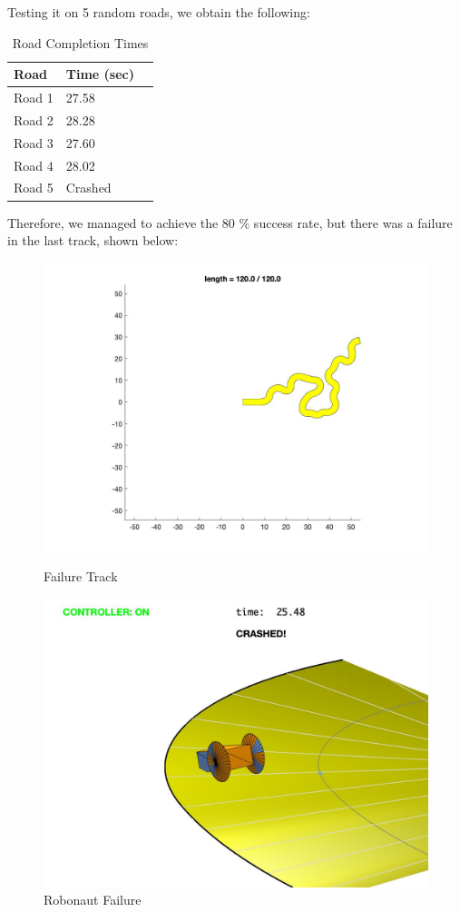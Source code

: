 \documentclass{article}
\begin{document}
Testing it on 5 random roads, we obtain the following:
\begin{table}[h!]
\centering
\begin{tabular}{|p{4cm}|p{4cm}|p{4cm}|}
\hline
Road & Time (sec)\\
\hline \hline
Road 1 & 27.58\\
Road 2 & 28.28\\
Road 3 & 27.60\\ 
Road 4 & 28.02\\ 
Road 5 & Crashed\\
\hline
\end{tabular}
\caption{Road Completion Times\label{roadTimesGain}}
\end{table}
Therefore, we managed to achieve the 80 $\%$ success rate, but there was a failure in the last track, shown below:
 \begin{figure}[H]
\centering
\begin{minipage}{.5\textwidth}
	\centering
	\includegraphics[width=.8\linewidth]{controller 2 failure.jpg}
	\caption{Failure Track}
	\end{minipage}%
\begin{minipage}{.5\textwidth}
	\centering
	\includegraphics[width=.8\linewidth]{controller 2 fail.jpg}
	\caption{Robonaut Failure}
\end{minipage}
\end{figure}
\end{document}
